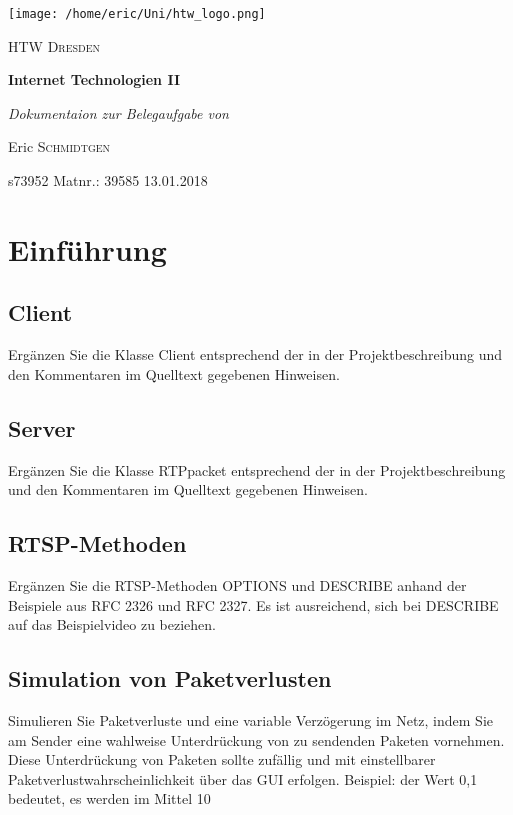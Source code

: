 



	\begin{titlepage}
		\centering
		\texttt{[image: /home/eric/Uni/htw\_logo.png]}\par\vspace{1cm}
		{\scshape\LARGE HTW Dresden \par}
		\vspace{2cm}
		{\huge\bfseries Internet Technologien II \par}
		\vspace{2cm}
		{\Large\itshape Dokumentaion zur Belegaufgabe von\par Eric \textsc{Schmidtgen} \par}
		\vfill
		s73952 \ret
		Matnr.: 39585
		\vfill
		{13.01.2018}
	\end{titlepage}
\newpage \tableofcontents \newpage


\section{Einführung}
\subsection{Client}
Ergänzen Sie die Klasse Client entsprechend der in der Projektbeschreibung und den Kommentaren im Quelltext gegebenen Hinweisen.
\subsection{Server}
Ergänzen Sie die Klasse RTPpacket entsprechend der in der Projektbeschreibung und den Kommentaren im Quelltext gegebenen Hinweisen.
\subsection{RTSP-Methoden}
Ergänzen Sie die RTSP-Methoden OPTIONS und DESCRIBE anhand der Beispiele aus RFC 2326 und RFC 2327. Es ist ausreichend, sich bei DESCRIBE auf das Beispielvideo zu beziehen.
\subsection{Simulation von Paketverlusten}
Simulieren Sie Paketverluste und eine variable Verzögerung im Netz, indem Sie am Sender eine wahlweise Unterdrückung von zu sendenden Paketen vornehmen. Diese Unterdrückung von Paketen sollte zufällig und mit einstellbarer Paketverlustwahrscheinlichkeit über das GUI erfolgen. Beispiel: der Wert 0,1 bedeutet, es werden im Mittel 10%
